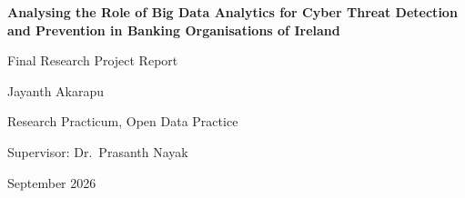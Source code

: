 \documentclass[12pt,a4paper]{article}
\begin{document}
\begin{titlepage}
\centering
\vspace*{2cm}
{\LARGE\bfseries Analysing the Role of Big Data Analytics for Cyber Threat Detection and Prevention in Banking Organisations of Ireland\par}
\vspace{1.5cm}
{\Large Final Research Project Report\par}
\vspace{1.5cm}
{\large Jayanth Akarapu\par}
\vspace{0.6cm}
Research Practicum, Open Data Practice\par
Supervisor: Dr.\ Prasanth Nayak\par
\vfill
{\large September 2026\par}
\end{titlepage}
\end{document}
